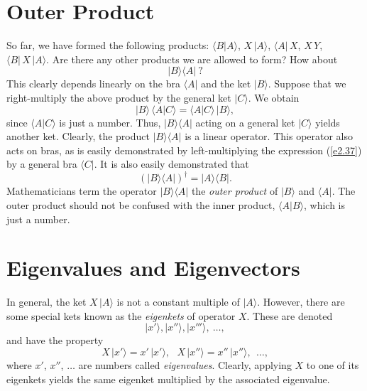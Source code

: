 \section{Outer Product}
So far, we have formed the following products: $\langle B| A \rangle$, $X\,|A \rangle$,
$\langle A|\, X$, $X\,Y$, $\langle B| \,X \,| A\rangle$. Are there any other products
we are allowed to form? How about
\begin{equation}\label{e2.37}
|B \rangle \langle A|~?
\end{equation}
This clearly depends linearly on the bra $\langle A|$ and the ket $|B\rangle$.
Suppose that we right-multiply the above product by the general ket
 $|C \rangle$.
We obtain 
\begin{equation}
|B \rangle\,\langle A | C\rangle = \langle A | C\rangle \,|B \rangle,
\end{equation}
since $\langle A | C\rangle$ is just a number. Thus, $|B\rangle \langle A|$ acting
on a general ket $|C\rangle$ yields another ket. Clearly, the product 
$|B\rangle \langle A|$ is a linear  operator. This operator also acts on bras,
as is easily demonstrated by left-multiplying the expression (\ref{e2.37}) by a general
bra $\langle C|$. It is also easily demonstrated that
\begin{equation}
(|B \rangle \langle A|)^{\dag} = |A \rangle \langle B|.
\end{equation}
Mathematicians term the operator $|B \rangle \langle A|$ the {\em outer product}\/ 
of $|B \rangle$ and $\langle A|$. The outer product should not be confused with
the inner product, $\langle A|B \rangle$, which is just a number. 

\section{Eigenvalues and Eigenvectors}\label{s2.8}
In general, the ket $X\,|A\rangle$ is not a constant multiple of $|A\rangle$.
However, there are some special kets 
 known as the {\em eigenkets}\/ of operator $X$. These are denoted
\begin{equation}
|x'\rangle, |x''\rangle, |x'''\rangle, ~\ldots,
\end{equation}
and have the property 
\begin{equation}
X\,|x'\rangle = x'\,|x'\rangle,~~~X\,|x''\rangle = x''\,|x''\rangle, ~~\dots,
\end{equation}
where $x'$, $x''$, $\ldots$ are  numbers called
{\em eigenvalues}. Clearly, applying $X$ to one of its
eigenkets yields the same eigenket multiplied by the associated eigenvalue.

